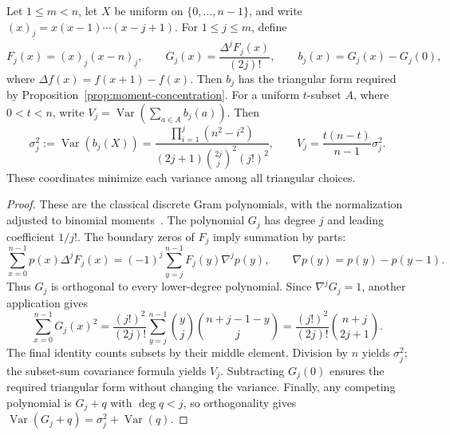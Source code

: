 \begin{lemma}
\label{lem:gram-moment-variances}
Let $1\le m<n$, let $X$ be uniform on $\{0,\ldots,n-1\}$, and write
$(x)_{\underline j}=x(x-1)\cdots(x-j+1)$.
For $1\le j\le m$, define
\[
 F_j(x)=(x)_{\underline j}(x-n)_{\underline j},\qquad
 G_j(x)=\frac{\Delta^j F_j(x)}{(2j)!},\qquad
 b_j(x)=G_j(x)-G_j(0),
\]
where $\Delta f(x)=f(x+1)-f(x)$.
Then $b_j$ has the triangular form required by
Proposition~\ref{prop:moment-concentration}. For a uniform $t$-subset
$A$, where $0<t<n$, write $V_j=\operatorname{Var}(\sum_{a\in A}b_j(a))$.
Then
\[
 \sigma_j^2:=\operatorname{Var}(b_j(X))
 =\frac{\prod_{i=1}^j(n^2-i^2)}
 {(2j+1)\binom{2j}{j}^{\!2}(j!)^2},\qquad
 V_j=\frac{t(n-t)}{n-1}\sigma_j^2.
\]
These coordinates minimize each variance among all triangular choices.
\end{lemma}
\begin{proof}
These are the classical discrete Gram polynomials, with the
normalization adjusted to binomial moments~\cite{linwong}.
The polynomial $G_j$ has degree $j$ and leading coefficient $1/j!$.
The boundary zeros of $F_j$ imply summation by parts:
\[
 \sum_{x=0}^{n-1}p(x)\Delta^jF_j(x)
 =(-1)^j\sum_{y=j}^{n-1}F_j(y)\nabla^jp(y),
 \qquad \nabla p(y)=p(y)-p(y-1).
\]
Thus $G_j$ is orthogonal to every lower-degree polynomial.
Since $\nabla^jG_j=1$, another application gives
\[
 \sum_{x=0}^{n-1}G_j(x)^2
 =\frac{(j!)^2}{(2j)!}
   \sum_{y=j}^{n-1}\binom yj\binom{n+j-1-y}j
 =\frac{(j!)^2}{(2j)!}\binom{n+j}{2j+1}.
\]
The final identity counts subsets by their middle element.
Division by $n$ yields $\sigma_j^2$; the subset-sum covariance
formula yields $V_j$. Subtracting $G_j(0)$ ensures the required
triangular form without changing the variance.
Finally, any competing polynomial is $G_j+q$ with $\deg q<j$,
so orthogonality gives
$\operatorname{Var}(G_j+q)=\sigma_j^2+\operatorname{Var}(q)$.
\end{proof}

